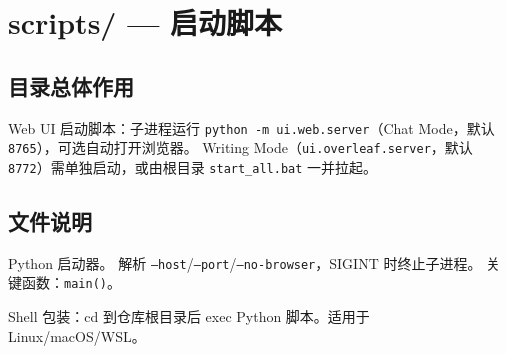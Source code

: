 \section{scripts/ — 启动脚本}

\subsection{目录总体作用}

Web UI 启动脚本：子进程运行 \texttt{python -m ui.web.server}（Chat Mode，默认 \texttt{8765}），可选自动打开浏览器。
Writing Mode（\texttt{ui.overleaf.server}，默认 \texttt{8772}）需单独启动，或由根目录 \texttt{start\_all.bat} 一并拉起。

\subsection{文件说明}

\begin{description}[leftmargin=4em,style=nextline]
    \item[\texttt{start\_texagent\_web.py}]
    Python 启动器。
    解析 \texttt{--host}/\texttt{--port}/\texttt{--no-browser}，SIGINT 时终止子进程。
    关键函数：\texttt{main()}。

    \item[\texttt{start-texagent-web.sh}]
    Shell 包装：cd 到仓库根目录后 exec Python 脚本。适用于 Linux/macOS/WSL。
\end{description}
